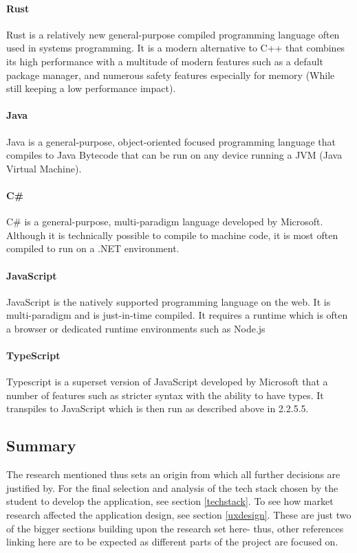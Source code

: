 \paragraph{Rust}
Rust is a relatively new general-purpose compiled programming language often used in systems programming. It is a modern alternative to C++ that combines its high performance with a multitude of modern features such as a default package manager, and numerous safety features especially for memory (While still keeping a low performance impact).

\paragraph{Java}
Java is a general-purpose, object-oriented focused programming language that compiles to Java Bytecode that can be run on any device running a JVM (Java Virtual Machine).

\paragraph{C\#}
C\# is a general-purpose, multi-paradigm language developed by Microsoft. Although it is technically possible to compile to machine code, it is most often compiled to run on a .NET environment.

\paragraph{JavaScript}
JavaScript is the natively supported programming language on the web. It is multi-paradigm and is just-in-time compiled. It requires a runtime which is often a browser or dedicated runtime environments such as Node.js

\paragraph{TypeScript}
Typescript is a superset version of JavaScript developed by Microsoft that a number of features such as stricter syntax with the ability to have types. It transpiles to JavaScript which is then run as described above in 2.2.5.5.

\subsection{Summary}
The research mentioned thus sets an origin from which all further decisions are justified by. For the final selection and analysis of the tech stack chosen by the student to develop the application, see section \ref{techstack}. To see how market research affected the application design, see section \ref{uxdesign}. These are just two of the bigger sections building upon the research set here- thus, other references linking here are to be expected as different parts of the project are focused on.


